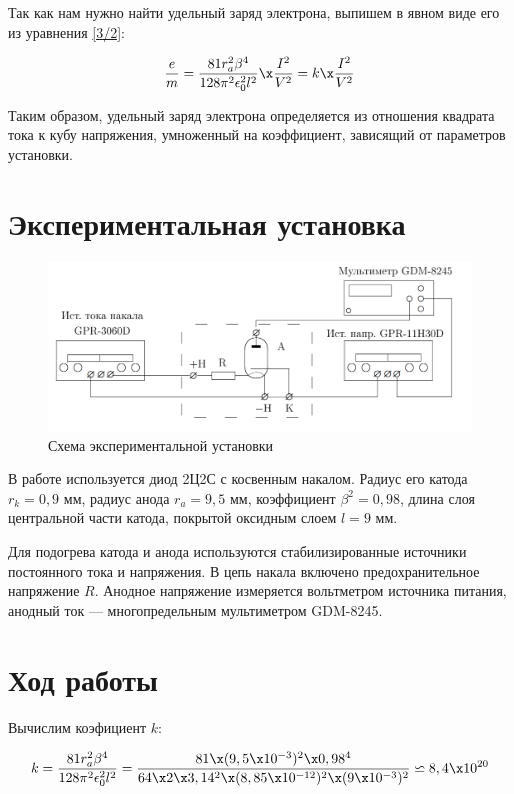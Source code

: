 \documentclass[12pt]{kiarticle}
\begin{document}
Так как нам нужно найти удельный заряд электрона, выпишем в явном виде его из уравнения \eqref{3/2}:

\begin{equation}\label{e/m}
\dfrac{e}{m} = \dfrac{81r_a^2\beta^4}{128\pi^2\epsilon_0^2l^2} \x \dfrac{I^2}{V^2} = k \x \dfrac{I^2}{V^2}
\end{equation}

Таким образом, удельный заряд электрона определяется из отношения квадрата тока к кубу напряжения, умноженный на коэффициент, зависящий от параметров установки.

\section{Экспериментальная установка}
\begin{figure}[h]
	\includegraphics[width=15cm]{lab}
	\caption{Схема экспериментальной установки}
\end{figure}

В работе используется диод 2Ц2С с косвенным накалом. Радиус его катода $ r_k = 0,9 $ мм, радиус анода $ r_a = 9,5  $ мм, коэффициент $ \beta^2 = 0,98 $, длина слоя центральной части катода, покрытой оксидным слоем $ l = 9 $ мм.

Для подогрева катода и анода используются стабилизированные источники постоянного тока и напряжения. В цепь накала включено предохранительное напряжение $ R $. Анодное напряжение измеряется вольтметром источника питания, анодный ток --- многопредельным мультиметром GDM-8245. 


\section{Ход работы}

Вычислим коэфициент $ k $:

\begin{equation}\label{}
k = \dfrac{81r_a^2\beta^4}{128\pi^2\epsilon_0^2l^2} = \dfrac {81\x(9,5\x10^{-3})^2\x0,98^4}{64\x2\x3,14^2\x(8,85\x10^{-12})^2\x(9\x10^{-3})^2} \backsimeq 8,4 \x 10^{20}
\end{equation}
\end{document}
